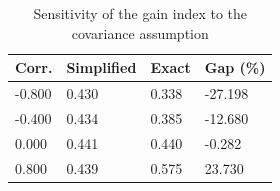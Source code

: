 \begin{table}[!htbp]
\centering
\caption{Sensitivity of the gain index to the covariance assumption}
\label{tab:sim_covariance}
\small
\begin{tabular}{llll}
\toprule
Corr. & Simplified & Exact & Gap (\%) \\
\midrule
-0.800 & 0.430 & 0.338 & -27.198 \\
-0.400 & 0.434 & 0.385 & -12.680 \\
0.000 & 0.441 & 0.440 & -0.282 \\
0.800 & 0.439 & 0.575 & 23.730 \\
\bottomrule
\end{tabular}
\end{table}
